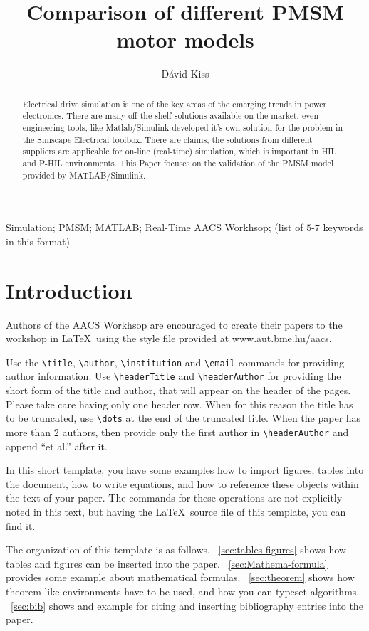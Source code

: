\documentclass[twoside,b5paper,10pt]{article}
\title{Comparison of different PMSM motor models}
\author{Dávid Kiss}
\begin{document}
\makeAutStyleTitle


\begin{abstract}
Electrical drive simulation is one of the key areas of the emerging trends in power electronics. There are many off-the-shelf solutions available on the market, even engineering tools, like Matlab/Simulink developed it's own solution for the problem in the Simscape Electrical toolbox. There are claims, the solutions from different suppliers are applicable for on-line (real-time) simulation, which is important in HIL and P-HIL environments. This Paper focuses on the validation of the PMSM model provided by MATLAB/Simulink.
\end{abstract}


\begin{keywords}
Simulation; PMSM; MATLAB; Real-Time AACS Workhsop; (list of $5$-$7$ keywords in this
format)
\end{keywords}

\section{Introduction}
\label{sec:Introdu}

Authors of the AACS Workhsop are encouraged to create their papers
to the workshop in \LaTeX \ using the style file provided at
www.aut.bme.hu$\slash$aacs.

Use the \verb|\title|, \verb|\author|, \verb|\institution| and
\verb|\email| commands for providing author information.
Use \verb|\headerTitle| and \verb|\headerAuthor| for providing the short form of the title and author, that will appear on the header of the pages. Please take care having only one header row. When for this reason the title has to be truncated, use \verb|\dots| at the end of the truncated title. When the paper has more than $2$ authors, then provide only the first author in \verb|\headerAuthor| and append ``et al.'' after it.

In this short template, you have some examples how to import
figures, tables into the document, how to write equations, and how
to reference these objects within the text of your paper. The
commands for these operations are not explicitly noted in this text,
but having the \LaTeX \ source file of this template, you can find
it.

The organization of this template is as follows.
\sectionname~\ref{sec:tables-figures} shows how tables and figures can be
inserted into the paper. \sectionname~\ref{sec:Mathema-formula} provides
some example about mathematical formulas. \sectionname~\ref{sec:theorem}
shows how theorem-like environments have to be used, and how you can
typeset algorithms. \sectionname~\ref{sec:bib} shows and example for
citing and inserting bibliography entries into the paper.
\end{document}

